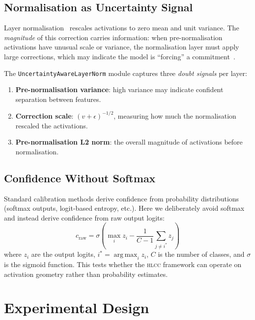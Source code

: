 \documentclass[11pt,a4paper]{article}
\newcommand{\hlcc}{\textsc{hlcc}}
\DeclareMathOperator*{\argmax}{arg\,max}
\begin{document}
\subsection{Normalisation as Uncertainty Signal}

Layer normalisation~\cite{ba2016layer} rescales activations to zero
mean and unit variance.  The \emph{magnitude} of this correction
carries information: when pre-normalisation activations have unusual
scale or variance, the normalisation layer must apply large
corrections, which may indicate the model is ``forcing'' a
commitment~\cite{mccallum2026hlcc}.

The \texttt{UncertaintyAwareLayerNorm} module captures three
\emph{doubt signals} per layer:
\begin{enumerate}
  \item \textbf{Pre-normalisation variance}: high variance may indicate
        confident separation between features.
  \item \textbf{Correction scale}: $(v + \epsilon)^{-1/2}$, measuring how
        much the normalisation rescaled the activations.
  \item \textbf{Pre-normalisation L2 norm}: the overall magnitude of
        activations before normalisation.
\end{enumerate}

\subsection{Confidence Without Softmax}

Standard calibration methods derive confidence from probability
distributions (softmax outputs, logit-based entropy, etc.).  Here
we deliberately avoid softmax and instead derive confidence from
raw output logits:
\begin{equation}
  c_{\text{raw}} = \sigma\!\left(\max_i z_i - \frac{1}{C-1}\sum_{j \neq i^*} z_j\right)
  \label{eq:raw_conf}
\end{equation}
where $z_i$ are the output logits, $i^* = \argmax_i z_i$, $C$ is the
number of classes, and $\sigma$ is the sigmoid function.  This tests
whether the \hlcc{} framework can operate on activation geometry
rather than probability estimates.

\section{Experimental Design}
\label{sec:design}
\end{document}
